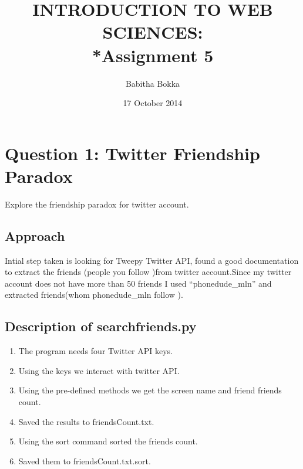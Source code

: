 \documentclass[12pt]{article}
\begin{document}
\begin{titlepage}
\title{INTRODUCTION TO WEB SCIENCES:\\*Assignment 5}
\author{Babitha Bokka}
\date{17 October 2014}
\maketitle
\end{titlepage}

\tableofcontents
\newpage
\section{Question 1: Twitter Friendship Paradox}
Explore the friendship paradox for twitter account.
\subsection{Approach}
Intial step taken is looking for Tweepy Twitter API, found a good documentation to extract the friends (people you follow )from twitter account.Since my twitter account does not have more than 50 friends I used ``phonedude\_mln'' and extracted friends(whom phonedude\_mln follow ).
\subsection{Description of searchfriends.py}
\begin{enumerate}
	\item The program needs four Twitter API keys.
	\item Using the keys we interact with twitter API.
	\item Using the pre-defined methods we get the screen name and friend friends count.
	\item Saved the results to friendsCount.txt.
	\item Using the sort command sorted the friends count.
	\item Saved them to friendsCount.txt.sort.
\end{enumerate}
\end{document}
